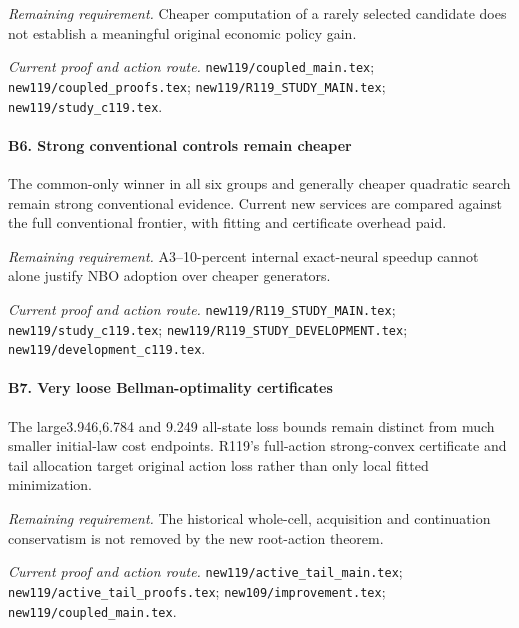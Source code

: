 \par\emph{Remaining requirement.} Cheaper computation of a rarely selected candidate does not establish a meaningful original economic policy gain.

\par\emph{Current proof and action route.} \nolinkurl{new119/coupled_main.tex}; \nolinkurl{new119/coupled_proofs.tex}; \nolinkurl{new119/R119_STUDY_MAIN.tex}; \nolinkurl{new119/study_c119.tex}.

\paragraph{B6. Strong conventional controls remain cheaper}

The common-only winner in all six groups and generally cheaper quadratic search remain strong conventional evidence. Current new services are compared against the full conventional frontier, with fitting and certificate overhead paid.

\par\emph{Remaining requirement.} A3--10-percent internal exact-neural speedup cannot alone justify NBO adoption over cheaper generators.

\par\emph{Current proof and action route.} \nolinkurl{new119/R119_STUDY_MAIN.tex}; \nolinkurl{new119/study_c119.tex}; \nolinkurl{new119/R119_STUDY_DEVELOPMENT.tex}; \nolinkurl{new119/development_c119.tex}.

\paragraph{B7. Very loose Bellman-optimality certificates}

The large3.946,6.784 and 9.249 all-state loss bounds remain distinct from much smaller initial-law cost endpoints. R119's full-action strong-convex certificate and tail allocation target original action loss rather than only local fitted minimization.

\par\emph{Remaining requirement.} The historical whole-cell, acquisition and continuation conservatism is not removed by the new root-action theorem.

\par\emph{Current proof and action route.} \nolinkurl{new119/active_tail_main.tex}; \nolinkurl{new119/active_tail_proofs.tex}; \nolinkurl{new109/improvement.tex}; \nolinkurl{new119/coupled_main.tex}.

